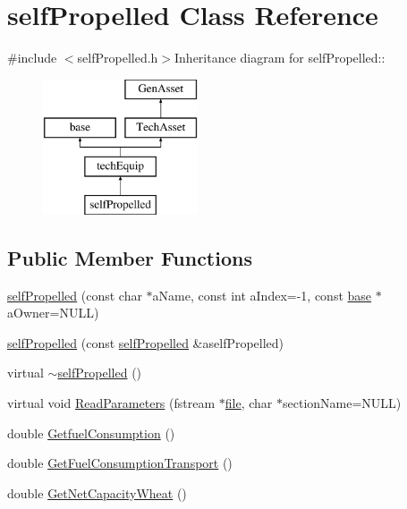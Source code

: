 \hypertarget{classself_propelled}{
\section{selfPropelled Class Reference}
\label{classself_propelled}
}


{\ttfamily \#include $<$selfPropelled.h$>$}Inheritance diagram for selfPropelled::\begin{figure}[H]
\begin{center}
\leavevmode
\includegraphics[height=4cm]{classself_propelled}
\end{center}
\end{figure}
\subsection*{Public Member Functions}
\begin{DoxyCompactItemize}
\item 
\hyperlink{classself_propelled_a3220b264471ecf881c44bdcf974a149a}{selfPropelled} (const char $\ast$aName, const int aIndex=-\/1, const \hyperlink{classbase}{base} $\ast$aOwner=NULL)
\item 
\hyperlink{classself_propelled_a4f1cb9f067cf45aa1b966fd70be35667}{selfPropelled} (const \hyperlink{classself_propelled}{selfPropelled} \&aselfPropelled)
\item 
virtual \hyperlink{classself_propelled_a2092fb2d3a8fe34c6b3c90c5653723f7}{$\sim$selfPropelled} ()
\item 
virtual void \hyperlink{classself_propelled_a13e862db150a5804947fe838384529df}{ReadParameters} (fstream $\ast$\hyperlink{classbase_a3af52ee9891719d09b8b19b42450b6f6}{file}, char $\ast$sectionName=NULL)
\item 
double \hyperlink{classself_propelled_a8404b0e95f4a48b0782809fab42395a6}{GetfuelConsumption} ()
\item 
double \hyperlink{classself_propelled_acb2c1c8578b6fa7654d80f3f50cb4b41}{GetFuelConsumptionTransport} ()
\item 
double \hyperlink{classself_propelled_ad1183006977e6dfb2e78cd6d72bafe68}{GetNetCapacityWheat} ()
\end{DoxyCompactItemize}
